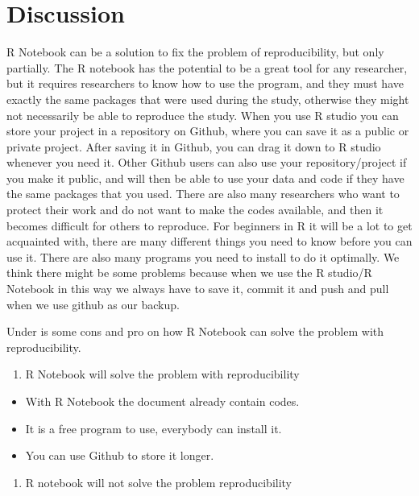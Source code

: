 \documentclass[
  12pt,
]{article}
\providecommand{\tightlist}{%
  \setlength{\itemsep}{0pt}\setlength{\parskip}{0pt}}
\begin{document}
\hypertarget{discussion}{%
\section{Discussion}\label{discussion}}

R Notebook can be a solution to fix the problem of reproducibility, but
only partially. The R notebook has the potential to be a great tool for
any researcher, but it requires researchers to know how to use the
program, and they must have exactly the same packages that were used
during the study, otherwise they might not necessarily be able to
reproduce the study. When you use R studio you can store your project in
a repository on Github, where you can save it as a public or private
project. After saving it in Github, you can drag it down to R studio
whenever you need it. Other Github users can also use your
repository/project if you make it public, and will then be able to use
your data and code if they have the same packages that you used. There
are also many researchers who want to protect their work and do not want
to make the codes available, and then it becomes difficult for others to
reproduce. For beginners in R it will be a lot to get acquainted with,
there are many different things you need to know before you can use it.
There are also many programs you need to install to do it optimally. We
think there might be some problems because when we use the R studio/R
Notebook in this way we always have to save it, commit it and push and
pull when we use github as our backup.

Under is some cons and pro on how R Notebook can solve the problem with
reproducibility.

\begin{enumerate}
\def\labelenumi{\arabic{enumi}.}
\tightlist
\item
  R Notebook will solve the problem with reproducibility
\end{enumerate}

\begin{itemize}
\tightlist
\item
  With R Notebook the document already contain codes.
\item
  It is a free program to use, everybody can install it.
\item
  You can use Github to store it longer.
\end{itemize}

\begin{enumerate}
\def\labelenumi{\arabic{enumi}.}
\setcounter{enumi}{1}
\tightlist
\item
  R notebook will not solve the problem reproducibility
\end{enumerate}
\end{document}

